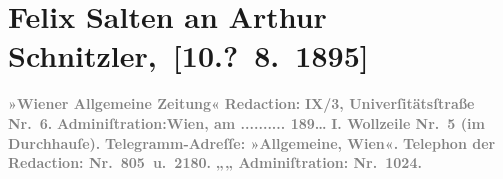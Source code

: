 

         
         \renewcommand{\erwaehntePersonen}{Personen: Felix Salten}
         \renewcommand{\erwaehnteInstitutionen}{Institutionen: Wiener Allgemeine Zeitung}
         \renewcommand{\erwaehnteOrte}{Orte: Bad Ischl, Hörlgasse, Universitätsstraße, Wien, Wollzeile}
         \renewcommand{\erwaehnteWerke}{}
               \section[ Felix Salten an Arthur Schnitzler, {[}10.? 8. 1895{]}]{ Felix Salten an Arthur Schnitzler, {[}10.? 8. 1895{]}}\nopagebreak{}\rehead{ }\begin{ledgroupsized}[t]{13cm}\normalsize\beginnumbering{} \toendnotes[C]{\smallbreak\pagebreak[2]} 
\toendnotes[C]{\smallbreak}\pstart
           \noindent{}{\pb}\textcolor{gray}{\textbf{\textbf{»Wiener Allgemeine
                        Zeitung«}}}\pend
           \pstart
           \textcolor{gray}{\textbf{Redaction:}}\pend
           \pstart
           \textcolor{gray}{\textbf{\textbf{IX/3, Univerſitätsſtraße Nr. 6.}}}\pend
           \pstart
           \textcolor{gray}{\textbf{Adminiſtration:}}\hfill \textcolor{gray}{\textbf{Wien, am ..........{ }189{\dots}}}\pend
           \pstart
           \textcolor{gray}{\textbf{\textbf{I. Wollzeile Nr. 5} (im Durchhauſe).}}\pend
           \pstart
           \textcolor{gray}{\textbf{Telegramm-Adreſſe: »Allgemeine, Wien«.}}\pend
           \pstart
           \textcolor{gray}{\textbf{Telephon der Redaction: Nr. 805 u. 2180.}}\pend
           \pstart
           \textcolor{gray}{\textbf{\hspace*{1.5em}„\hspace*{1.5em}„\hspace*{1.5em} Adminiſtration: Nr. 1024.}}\pend

\end{ledgroupsized}
